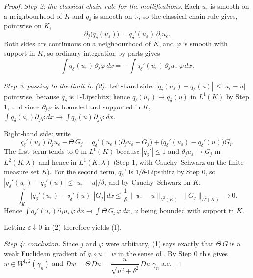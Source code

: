 \begin{proof}
\emph{Step 2: the classical chain rule for the mollifications.}
Each $u_\varepsilon$ is smooth on a neighbourhood of $K$ and $q_\delta$ is smooth
on $\mathbb{R}$, so the classical chain rule gives, pointwise on $K$,
\[
  \partial_j\bigl(q_\delta(u_\varepsilon)\bigr) = q_\delta'(u_\varepsilon)\,\partial_j u_\varepsilon .
\]
Both sides are continuous on a neighbourhood of $K$, and $\varphi$ is smooth with
support in $K$, so ordinary integration by parts gives
\begin{equation*}
  \int q_\delta(u_\varepsilon)\,\partial_j\varphi \, dx
    = -\int q_\delta'(u_\varepsilon)\,\partial_j u_\varepsilon\; \varphi\, dx . \tag{2}
\end{equation*}

\emph{Step 3: passing to the limit in (2).}
Left-hand side: $|q_\delta(u_\varepsilon) - q_\delta(u)| \leq |u_\varepsilon - u|$
pointwise, because $q_\delta$ is $1$-Lipschitz; hence
$q_\delta(u_\varepsilon) \to q_\delta(u)$ in $L^1(K)$ by Step 1, and since
$\partial_j\varphi$ is bounded and supported in $K$,
$\int q_\delta(u_\varepsilon)\partial_j\varphi\,dx \to
\int q_\delta(u)\,\partial_j\varphi\, dx$.

Right-hand side: write
\[
  q_\delta'(u_\varepsilon)\,\partial_j u_\varepsilon - \Theta\, G_j
    = q_\delta'(u_\varepsilon)\bigl(\partial_j u_\varepsilon - G_j\bigr)
      + \bigl(q_\delta'(u_\varepsilon) - q_\delta'(u)\bigr) G_j .
\]
The first term tends to $0$ in $L^1(K)$ because $|q_\delta'| \leq 1$ and
$\partial_j u_\varepsilon \to G_j$ in $L^2(K,\lambda)$ and hence in
$L^1(K,\lambda)$ (Step 1, with Cauchy--Schwarz on the finite-measure set $K$).  For the second term,
$q_\delta'$ is $1/\delta$-Lipschitz by Step 0, so
$|q_\delta'(u_\varepsilon) - q_\delta'(u)| \leq |u_\varepsilon - u|/\delta$, and
by Cauchy--Schwarz on $K$,
\[
  \int_K \bigl|q_\delta'(u_\varepsilon) - q_\delta'(u)\bigr|\,|G_j|\, dx
    \leq \frac{1}{\delta}\,\|u_\varepsilon - u\|_{L^2(K)}\,\|G_j\|_{L^2(K)}
    \longrightarrow 0 .
\]
Hence $\int q_\delta'(u_\varepsilon)\partial_ju_\varepsilon\,\varphi\,dx \to
\int \Theta\, G_j\,\varphi\, dx$, $\varphi$ being bounded with support in $K$.

Letting $\varepsilon \downarrow 0$ in (2) therefore yields (1).

\emph{Step 4: conclusion.}
Since $j$ and $\varphi$ were arbitrary, (1) says exactly that $\Theta\,G$ is a
weak Euclidean gradient of $q_\delta\circ u = w$ in the sense of
.  By Step 0 this gives $w \in W^{1,2}(\gamma_n)$ and
$Dw = \Theta\, Du = \dfrac{u}{\sqrt{u^2+\delta^2}}\,Du$ $\gamma_n$-a.e.
\end{proof}
